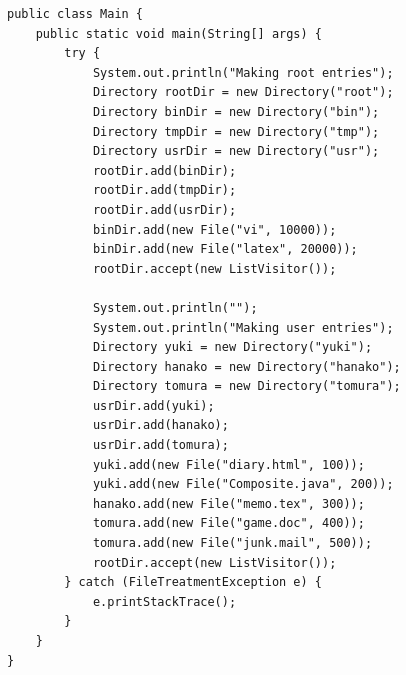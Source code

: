 \begin{lstlisting}
public class Main {
	public static void main(String[] args) {
		try {
			System.out.println("Making root entries");
			Directory rootDir = new Directory("root");
			Directory binDir = new Directory("bin");
			Directory tmpDir = new Directory("tmp");
			Directory usrDir = new Directory("usr");
			rootDir.add(binDir);
			rootDir.add(tmpDir);
			rootDir.add(usrDir);
			binDir.add(new File("vi", 10000));
			binDir.add(new File("latex", 20000));
			rootDir.accept(new ListVisitor());
			
			System.out.println("");
			System.out.println("Making user entries");
			Directory yuki = new Directory("yuki");
			Directory hanako = new Directory("hanako");
			Directory tomura = new Directory("tomura");
			usrDir.add(yuki);
			usrDir.add(hanako);
			usrDir.add(tomura);
			yuki.add(new File("diary.html", 100));
			yuki.add(new File("Composite.java", 200));
			hanako.add(new File("memo.tex", 300));
			tomura.add(new File("game.doc", 400));
			tomura.add(new File("junk.mail", 500));
			rootDir.accept(new ListVisitor());
		} catch (FileTreatmentException e) {
			e.printStackTrace();
		}
	}
}
\end{lstlisting}
